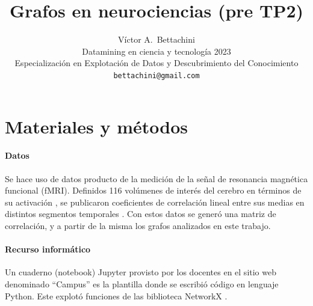 \documentclass{article}
\title{Grafos en neurociencias (pre TP2)}
\author{
  Víctor A.~Bettachini\\ %
  Datamining en ciencia y tecnología 2023\\
  Especialización en Explotación de Datos y Descubrimiento del Conocimiento\\
  \texttt{bettachini@gmail.com}
}
\begin{document}
\maketitle







\section{Materiales y métodos}

\paragraph{Datos}
Se hace uso de datos producto de la medición de la señal de resonancia magnética funcional (fMRI).
Definidos 116 volúmenes de interés del cerebro en términos de su activación \cite{tzourio-mazoyer_automated_2002}, se publicaron coeficientes de correlación lineal entre sus medias en distintos segmentos temporales \cite{tagliazucchi_large-scale_2013}.
Con estos datos se generó una matriz de correlación, y a partir de la misma los grafos analizados en este trabajo.


\paragraph{Recurso informático} 
Un cuaderno (notebook) Jupyter provisto por los docentes en el sitio web denominado ``Campus'' \cite{kamienkowski_curso_2023} es la plantilla donde se escribió código en lenguaje Python.
Este explotó funciones de las biblioteca NetworkX \cite{hagberg_exploring_2008}.
\end{document}
